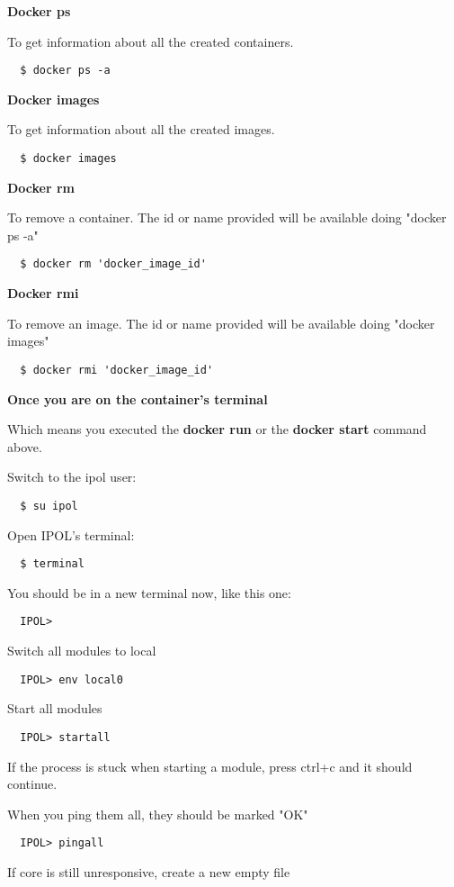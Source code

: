 \documentclass[a4paper,12pt]{article}
\begin{document}
\textbf{Docker ps}

To get information about all the created containers.
\begin{verbatim}
  $ docker ps -a
\end{verbatim}

\textbf{Docker images}

To get information about all the created images.
\begin{verbatim}
  $ docker images
\end{verbatim}

\textbf{Docker rm}

To remove a container. The id or name provided will be available doing "docker ps -a"
\begin{verbatim}
  $ docker rm 'docker_image_id'
\end{verbatim}

\textbf{Docker rmi}

To remove an image. The id or name provided will be available doing "docker images"
\begin{verbatim}
  $ docker rmi 'docker_image_id'
\end{verbatim}

\textbf{Once you are on the container's terminal}

Which means you executed the \textbf{docker run} or the \textbf{docker start} command above.

Switch to the ipol user:
\begin{verbatim}
  $ su ipol
\end{verbatim}

Open IPOL's terminal:
\begin{verbatim}
  $ terminal
\end{verbatim}

You should be in a new terminal now, like this one:
\begin{verbatim}
  IPOL>
\end{verbatim}

Switch all modules to local
\begin{verbatim}
  IPOL> env local0
\end{verbatim}

Start all modules
\begin{verbatim}
  IPOL> startall
\end{verbatim}
If the process is stuck when starting a module, press ctrl+c and it should continue.

When you ping them all, they should be marked "OK"
\begin{verbatim}
  IPOL> pingall
\end{verbatim}
If core is still unresponsive, create a new empty file
\end{document}

